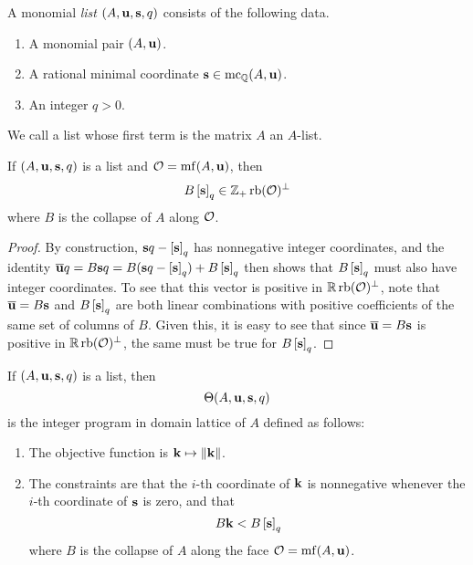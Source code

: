 \documentclass[11pt]{amsart}
\begin{document}
\begin{definition}
A monomial \emph{list} $(A, \mathbf{u}, \mathbf{s}, q)$ consists of the following data.
\begin{enumerate}
\item A monomial pair $(A, \mathbf{u})$.
\item A rational minimal coordinate $\mathbf{s} \in \operatorname{mc}_{\mathbb{Q}}(A, \mathbf{u})$.
\item An integer $q>0$.
\end{enumerate}
\end{definition}

\begin{definition}
We call a list whose first term is the matrix $A$ an $A$-list.
\end{definition}


\begin{lemma}
\label{tail projection: L}
If $(A, \mathbf{u}, \mathbf{s}, q)$ is a list and $\mathcal{O} = \operatorname{mf}(A, \mathbf{u})$, then 
\[ B\left[ \mathbf{s} \right]_q \in \mathbb{Z}_+ \operatorname{rb}(\mathcal{O})^{\perp} \]
where $B$ is the collapse of $A$ along $\mathcal{O}$.
\end{lemma}

\begin{proof}  By construction, $\mathbf{s}q - \left[ \mathbf{s} \right]_q $ has nonnegative integer coordinates, and the identity 
$\overline{\mathbf{u}} q =B \mathbf{s} q = B ( \mathbf{s}q - \left[ \mathbf{s} \right]_q ) +B \left[ \mathbf{s} \right]_q$ then shows that $B \left[ \mathbf{s} \right]_q$ must also have integer coordinates.   To see that this vector is positive in $\mathbb{R} \operatorname{rb}(\mathcal{O})^{\perp}$, note that $\overline{\mathbf{u}} = B \mathbf{s}$ and $B \left[ \mathbf{s} \right]_q$ are both linear combinations with positive coefficients of the same set of columns of $B$.  Given this, it is easy to see that since $\overline{\mathbf{u}} = B \mathbf{s}$ is positive in $\mathbb{R} \operatorname{rb}(\mathcal{O})^{\perp}$, the same must be true for $B \left[ \mathbf{s} \right]_q$.
\end{proof}

\begin{definition}  
\label{aux program: D}
If $(A, \mathbf{u}, \mathbf{s}, q)$ is a list, then
\[ \Theta(A, \mathbf{u}, \mathbf{s}, q) \] 
is the integer program in domain lattice of $A$ defined as follows:
\begin{enumerate}
\item The objective function is $\mathbf{k} \mapsto \| \mathbf{k} \|$.
\item The constraints are that the $i$-th coordinate of $\mathbf{k}$ is nonnegative whenever the $i$-th coordinate of $\mathbf{s}$ is zero, and that \[ B \mathbf{k}  < B \left[ \mathbf{s} \right]_q\]
where $B$ is the collapse of $A$ along the face $\mathcal{O} = \operatorname{mf}(A, \mathbf{u})$.
\end{enumerate}
\end{definition}
\end{document}
